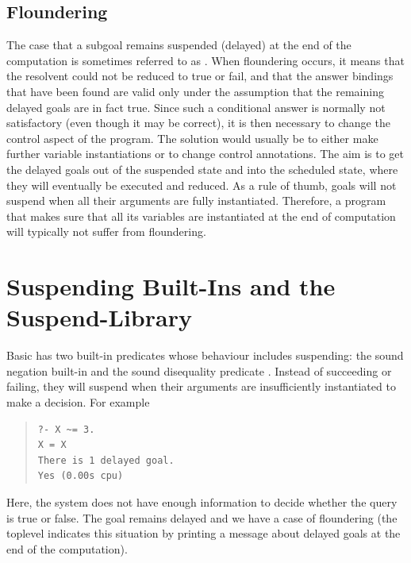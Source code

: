 \subsection{Floundering}
The case that a subgoal remains suspended (delayed) at the end of the
computation
 is sometimes referred to as .
When floundering occurs, it means that the resolvent could not be reduced
to true or fail, and that the answer bindings that have been found
are valid only under the assumption that the remaining delayed goals
are in fact true. Since such a conditional answer is normally not
satisfactory (even though it may be correct), it is then necessary to change
the control aspect of the program.  The solution would usually be to either
make further variable instantiations or to change control annotations.
The aim is to get the delayed goals out of the suspended state and
into the scheduled state, where they will eventually be executed and reduced.
As a rule of thumb, goals will not suspend when all their arguments are
fully instantiated. Therefore, a program that makes sure that all its
variables are instantiated at the end of computation will typically not
suffer from floundering.


\section{Suspending Built-Ins and the Suspend-Library}

Basic {\eclipse} has two built-in predicates whose behaviour includes
suspending: the sound negation built-in
 and the sound disequality
predicate .
Instead of succeeding or failing, they will suspend when their arguments
are insufficiently instantiated to make a decision. For example
\begin{quote}
\begin{verbatim}
?- X ~= 3.
X = X
There is 1 delayed goal.
Yes (0.00s cpu)
\end{verbatim}
\end{quote}
Here, the system does not have enough information to decide whether the
query is true or false. The goal remains delayed and we have a case of
floundering
(the {\eclipse} toplevel indicates this situation by printing a message
about delayed goals at the end of the computation).

